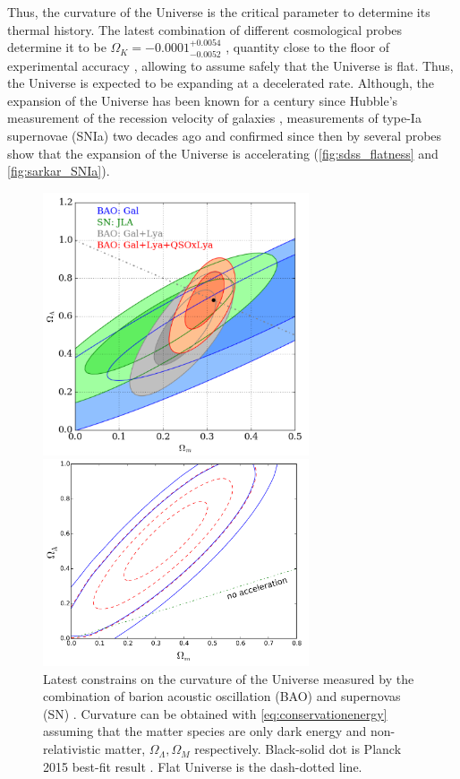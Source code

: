 Thus, the curvature of the Universe is the critical parameter to determine its thermal history. The latest combination of different cosmological probes determine it to be $\Omega_K = -0.0001^{+0.0054}_{-0.0052}$ \cite{2015arXiv150201589P}, quantity close to the floor of experimental accuracy \cite{2016PhRvD..94b3502L}, allowing to assume safely that the Universe is flat. Thus, the Universe is expected to be expanding at a decelerated rate. Although, the expansion of the Universe has been known for a century since Hubble's measurement of the recession velocity of galaxies \cite{1929PNAS...15..168H}, measurements of type-Ia supernovae (SNIa) two decades ago and  confirmed since then by several probes \cite{2008ARA&A..46..385F} show that the expansion of the Universe is accelerating (\autoref{fig:sdss_flatness} and \autoref{fig:sarkar_SNIa}).
\begin{figure}
\begin{center}
\includegraphics[width=0.7\textwidth]{./Pictures/omega_K_sdss.png}
\caption{Latest constrains on the curvature of the Universe measured by the combination of barion acoustic oscillation (BAO) and supernovas (SN) \cite{2017arXiv170200176B}. Curvature can be obtained with \autoref{eq:conservationenergy} assuming that the matter species are only dark energy and non-relativistic matter, $\Omega_\Lambda,\Omega_M$ respectively. Black-solid dot is Planck 2015 best-fit result \cite{2015arXiv150201589P}. Flat Universe is the dash-dotted line.}
\label{fig:sdss_flatness}
\vspace*{0.3cm}
\includegraphics[width=0.7\textwidth]{./Pictures/sarkar_acceleration.png}

\end{center}
\end{figure}

